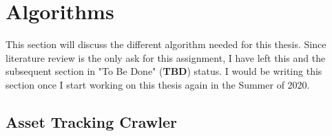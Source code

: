 %
%


%

\section{Algorithms} \label{sec:algo}
This section will discuss the different algorithm needed for this thesis. Since literature review is the only ask for this assignment, I have left this and the subsequent section in "To Be Done" (\textbf{TBD}) status. I would be writing this section once I start working on this thesis again in the Summer of 2020.
\subsection{Asset Tracking Crawler}\label{sec:algo_crawl}

